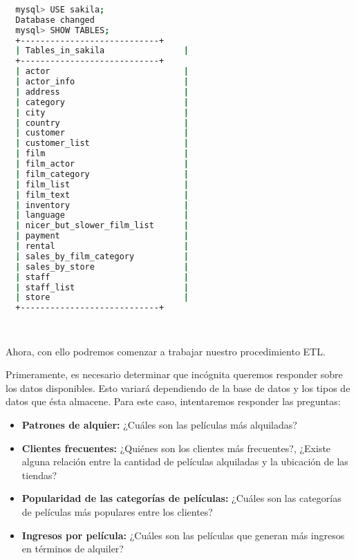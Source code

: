 \documentclass[12pt]{article}
\begin{document}
\vspace{12pt}
\begin{lstlisting}[language=Bash]
    
  mysql> USE sakila;
  Database changed
  mysql> SHOW TABLES;
  +----------------------------+
  | Tables_in_sakila                |
  +----------------------------+
  | actor                           |
  | actor_info                      |
  | address                         |
  | category                        |
  | city                            |
  | country                         |
  | customer                        |
  | customer_list                   |
  | film                            |
  | film_actor                      |
  | film_category                   |
  | film_list                       |
  | film_text                       |
  | inventory                       |
  | language                        |
  | nicer_but_slower_film_list      |
  | payment                         |
  | rental                          |
  | sales_by_film_category          |
  | sales_by_store                  |
  | staff                           |
  | staff_list                      |
  | store                           |
  +----------------------------+

    
\end{lstlisting}
\vspace{12pt}

Ahora, con ello podremos comenzar a trabajar nuestro procedimiento ETL.

Primeramente, es necesario determinar que incógnita queremos responder sobre los datos disponibles. Esto variará dependiendo de la base de datos y los tipos de datos que ésta almacene. Para este caso, intentaremos responder las preguntas:

\begin{itemize}
  \item \textbf{Patrones de alquier:} ¿Cuáles son las películas más alquiladas?
  \item \textbf{Clientes frecuentes:} ¿Quiénes son los clientes más frecuentes?, ¿Existe alguna relación entre la cantidad de películas alquiladas y la ubicación de las tiendas?
  \item \textbf{Popularidad de las categorías de películas:} ¿Cuáles son las categorías de películas más populares entre los clientes?
  \item \textbf{Ingresos por película:} ¿Cuáles son las películas que generan más ingresos en términos de alquiler?
\end{itemize}
\end{document}
